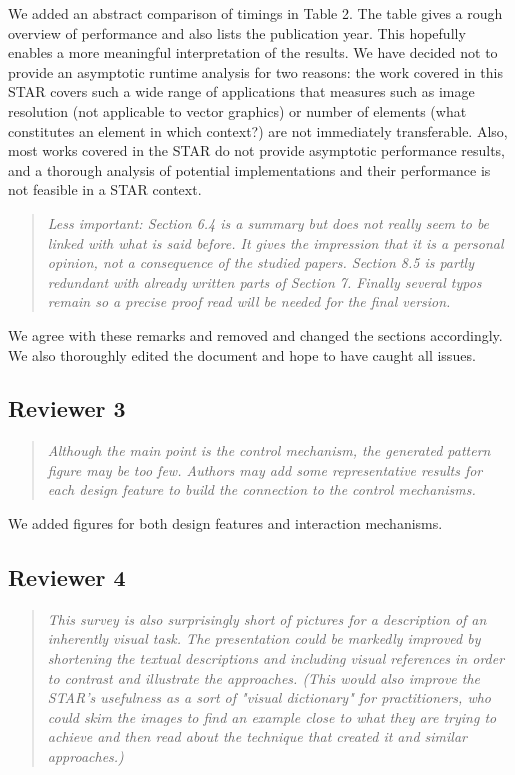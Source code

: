 \documentclass{egpubl}
\newcommand{\rev}[2]{{\color{greenrev}\textsuperscript{#1}#2}}
\renewcommand{\rev}[2]{{#2}}
\begin{document}
\rev{}{We added an abstract comparison of timings in Table 2. The table gives a rough overview of performance and also lists the publication year. This hopefully enables a more meaningful interpretation of the results. We have decided not to provide an asymptotic runtime analysis for two reasons: the work covered in this STAR covers such a wide range of applications that measures such as image resolution (not applicable to vector graphics) or number of elements (what constitutes an element in which context?) are not immediately transferable. Also, most works covered in the STAR do not provide asymptotic performance results, and a thorough analysis of potential implementations and their performance is not feasible in a STAR context.}

\begin{quote}
\emph{Less important: Section 6.4 is a summary but does not really seem to be linked with what is said before. It gives the impression that it is a personal opinion, not a consequence of the studied papers. Section 8.5 is partly redundant with already written parts of Section 7. Finally several typos remain so a precise proof read will be needed for the final version.}
\end{quote}

\rev{}{We agree with these remarks and removed and changed the sections accordingly. We also thoroughly edited the document and hope to have caught all issues.}


\subsection*{Reviewer 3}


\begin{quote}
\emph{Although the main point is the control mechanism, the generated pattern figure may be too few. Authors may add some representative results for each design feature to build the connection to the control mechanisms.}
\end{quote}

\rev{}{We added figures for both design features and interaction mechanisms.}


\subsection*{Reviewer 4} 

\begin{quote}
\emph{This survey is also surprisingly short of pictures for a description of an inherently visual task. The presentation could be markedly improved by shortening the textual descriptions and including visual references in order to contrast and illustrate the approaches. (This would also improve the STAR's usefulness as a sort of "visual dictionary" for practitioners, who could skim the images to find an example close to what they are trying to achieve and then read about the technique that created it and similar approaches.)}
\end{quote}
\end{document}
